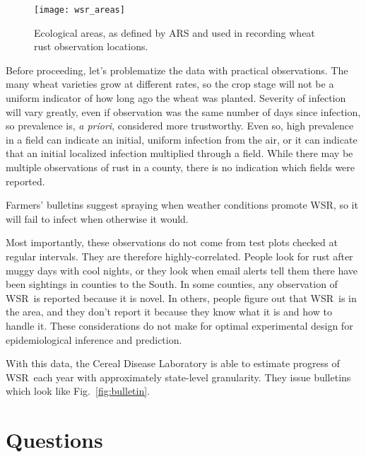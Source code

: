 \documentclass{article}
\newcommand{\wsr}{\textsc{WSR}}
\begin{document}
\medskip

\begin{figure}
\centerline{\texttt{[image: wsr\_areas]}}
\caption{Ecological areas, as defined by ARS and used in recording wheat rust observation locations.\label{fig:ars_areas}}
\end{figure}

Before proceeding, let's problematize the data with practical observations.
The many wheat varieties grow at different rates, so the crop stage will not be a uniform indicator of how long ago the wheat was planted. Severity of infection will vary greatly, even if observation was the same number of days since infection, so prevalence is, \textit{a priori}, considered more trustworthy. Even so, high prevalence in a field can indicate an initial, uniform infection from the air, or it can indicate that an initial localized infection multiplied through a field. While there may be multiple observations of rust in a county, there is no indication which fields were reported.

Farmers' bulletins suggest spraying when weather conditions promote \wsr, so it will fail to
infect when otherwise it would.

Most importantly, these observations do not come from test plots checked at regular intervals. They are therefore highly-correlated. People look for rust after muggy days with cool nights, or they look when email alerts tell them there have been sightings in counties to the South. In some counties, any observation of \wsr\ is reported because it is novel. In others, people figure out that \wsr\ is in the area, and they don't report it because they know what it is and how to handle it. These considerations do not make for optimal experimental design for epidemiological inference and prediction.

With this data, the Cereal Disease Laboratory is able to estimate progress of \wsr\ each year with approximately state-level granularity. They issue bulletins which look like Fig.~{\ref{fig:bulletin}}.

\section{Questions}
\end{document}
